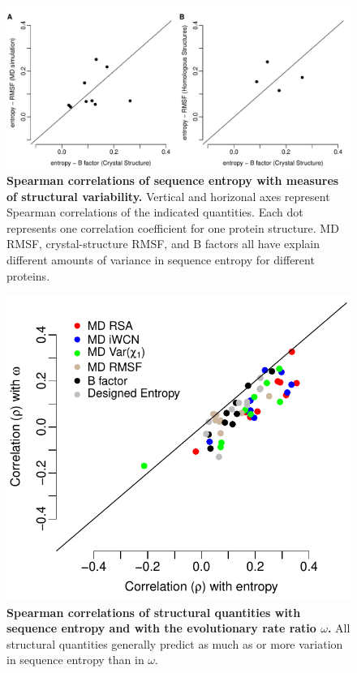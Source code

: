 \documentclass[12pt]{article}
\begin{document}
\begin{figure}[tbh]
\begin{center}
    \includegraphics[height=0.35\textheight]{cor_entropy_bfca_rmsf.pdf}
\end{center}
\caption{\textbf{Spearman correlations of sequence entropy with measures of structural variability.}
Vertical and horizonal axes represent Spearman correlations of the indicated quantities. Each dot represents one correlation coefficient for one protein structure. MD RMSF, crystal-structure RMSF, and B factors all have explain different amounts of variance in sequence entropy for different proteins.}
\label{fig:cor_entropy_bfca_rmsf}
\end{figure}

\begin{figure}[tbh]
\begin{center}
    \includegraphics[height=0.7\textheight]{cor_entropy_omega.pdf}
\end{center}
\caption{\textbf{Spearman correlations of structural quantities with sequence entropy and with the evolutionary rate ratio $\omega$.} All structural quantities generally predict as much as or more variation in sequence entropy than in $\omega$.}
\label{fig:cor_entropy_omega}
\end{figure}
\end{document}
